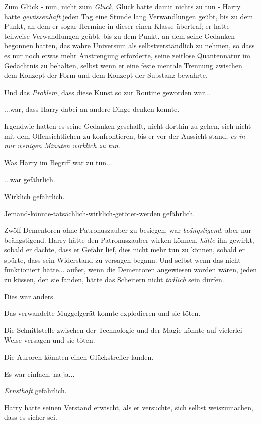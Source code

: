 {Zum Glück - nun, nicht zum \emph{Glück}, Glück hatte damit nichts zu tun - Harry hatte \emph{gewissenhaft} jeden Tag eine Stunde lang Verwandlungen geübt, bis zu dem Punkt, an dem er sogar Hermine in dieser einen Klasse übertraf; er hatte teilweise Verwandlungen geübt, bis zu dem Punkt, an dem seine Gedanken begonnen hatten, das wahre Universum als selbstverständlich zu nehmen, so dass es nur noch etwas mehr Anstrengung erforderte, seine zeitlose Quantennatur im Gedächtnis zu behalten, selbst wenn er eine feste mentale Trennung zwischen dem Konzept der Form und dem Konzept der Substanz bewahrte.

Und das \emph{Problem}, dass diese Kunst so zur Routine geworden war...

...war, dass Harry dabei an andere Dinge denken konnte.

Irgendwie hatten es seine Gedanken geschafft, nicht dorthin zu gehen, sich nicht mit dem Offensichtlichen zu konfrontieren, bis er vor der Aussicht stand, \emph{es in nur wenigen Minuten wirklich zu tun}.

Was Harry im Begriff war zu tun...

...war gefährlich.

Wirklich gefährlich.

Jemand-könnte-tatsächlich-wirklich-getötet-werden gefährlich.

Zwölf Dementoren ohne Patronuszauber zu besiegen, war \emph{beängstigend}, aber nur beängstigend. Harry hätte den Patronuszauber wirken können, \emph{hätte} ihn gewirkt, sobald er dachte, dass er Gefahr lief, dies nicht mehr tun zu können, sobald er spürte, dass sein Widerstand zu versagen begann. Und selbst wenn das nicht funktioniert hätte... außer, wenn die Dementoren angewiesen worden wären, jeden zu küssen, den sie fanden, hätte das Scheitern nicht \emph{tödlich} sein dürfen.

Dies war anders.

Das verwandelte Muggelgerät konnte explodieren und sie töten.

Die Schnittstelle zwischen der Technologie und der Magie könnte auf vielerlei Weise versagen und sie töten.

Die Auroren könnten einen Glückstreffer landen.

Es war einfach, na ja...

\emph{Ernsthaft} gefährlich.

Harry hatte seinen Verstand erwischt, als er versuchte, sich selbst weiszumachen, dass es sicher sei.

}
